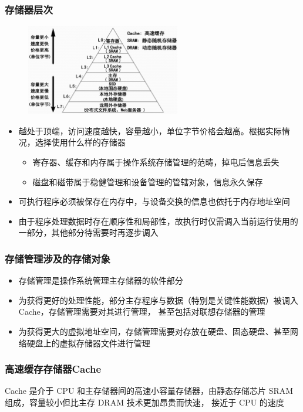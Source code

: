 \documentclass[cs4size,a4paper,10pt]{ctexart}
\begin{document}
	\subsubsection{存储器层次}
	\begin{figure}[H]
		\centering
		\includegraphics[width=0.6\textwidth]{img/3.1.4.1.1}
	\end{figure}
	\begin{itemize}
		\item 越处于顶端，访问速度越快，容量越小，单位字节价格会越高。根据实际情况，选择使用什么样的存储器
		\begin{itemize}
			\item 寄存器、缓存和内存属于操作系统存储管理的范畴，掉电后信息丢失
			\item 磁盘和磁带属于稳健管理和设备管理的管辖对象，信息永久保存
		\end{itemize}
		\item 可执行程序必须被保存在内存中，与设备交换的信息也依托于内存地址空间
		\item 由于程序处理数据时存在顺序性和局部性，故执行时仅需调入当前运行使用的一部分，其他部分待需要时再逐步调入
	\end{itemize}


	\subsubsection{存储管理涉及的存储对象}
	\begin{itemize}
		\item 存储管理是操作系统管理主存储器的软件部分
		\item 为获得更好的处理性能，部分主存程序与数据（特别是关键性能数据）被调入 Cache，存储管理需要对其进行管理， 甚至包括对联想存储器的管理
		\item 为获得更大的虚拟地址空间，存储管理需要对存放在硬盘、固态硬盘、甚至网络硬盘上的虚拟存储器文件进行管理
	\end{itemize}


	\subsubsection{高速缓存存储器Cache}
	Cache 是介于 CPU 和主存储器间的高速小容量存储器，由静态存储芯片 SRAM 组成，容量较小但比主存 DRAM 技术更加昂贵而快速， 接近于 CPU 的速度
\end{document}
